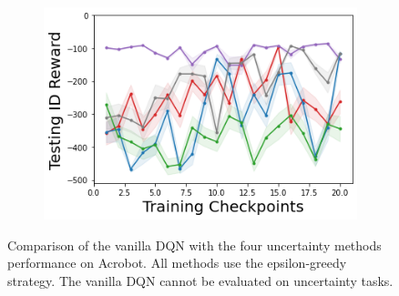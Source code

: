 \begin{figure}
\begin{subfigure}{.3\textwidth}
    \end{subfigure}
    \begin{subfigure}{.3\textwidth}
        \includegraphics[width=\textwidth]{sections/011_icml2022/resources/Acrobot-v1-mean_reward_-testing-model+.png}
    \end{subfigure}

        \caption{Comparison of the vanilla DQN with the four uncertainty methods performance on Acrobot. All methods use the epsilon-greedy strategy. The vanilla DQN cannot be evaluated on uncertainty tasks.}
    \label{fig:camprison-vanilla-acrobot}
\end{figure}